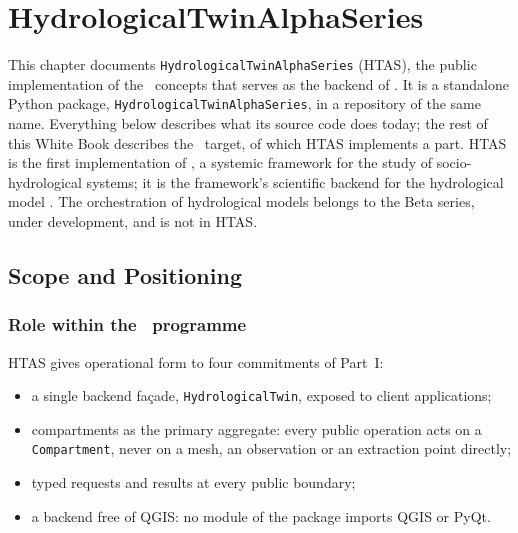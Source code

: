 \chapter{HydrologicalTwinAlphaSeries} \label{chap-proto-hydrotwin}

\fancyhead[LE]{\thepage}
\fancyhead[RO]{\thepage}
\renewcommand{\headrulewidth}{1pt}

\setlength{\parindent}{0cm}
\setlength{\parskip}{9pt}


This chapter documents \texttt{HydrologicalTwinAlphaSeries} (HTAS), the public
implementation of the \hydrot\ concepts that serves as the backend of \cwv. It
is a standalone Python package, \texttt{HydrologicalTwinAlphaSeries}, in a
repository of the same name. Everything below describes what its source code
does today; the rest of this White Book describes the \hydrot\ target, of
which HTAS implements a part. HTAS is the first implementation of
\hydrot, a systemic framework for the study of socio-hydrological systems;
it is the framework's scientific backend for the hydrological model \cw. The
orchestration of hydrological models belongs to the Beta series, under
development, and is not in HTAS.

\section{Scope and Positioning}

\subsection{Role within the \hydrot\ programme}

HTAS gives operational form to four commitments of Part~I:

\begin{itemize}
    \item a single backend façade, \texttt{HydrologicalTwin}, exposed to client applications;
    \item compartments as the primary aggregate: every public operation acts on a \texttt{Compartment}, never on a mesh, an observation or an extraction point directly;
    \item typed requests and results at every public boundary;
    \item a backend free of QGIS: no module of the package imports QGIS or PyQt.
\end{itemize}

